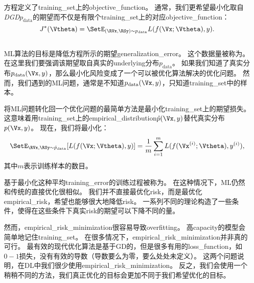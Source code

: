 方程定义了\gls{training_set}上的\gls{objective_function}。
通常，我们更希望最小化取自\emph{\gls{DGD}}$p_{\text{data}}$的期望而不仅是有限个\gls{training_set}上的对应\gls{objective_function}：
\begin{equation}
\label{eq:8.2}
    J^*(\Vtheta) = \SetE_{(\RVx, \RSy) \sim p_\text{data}} L(f(\Vx ;\Vtheta),y).
\end{equation}


\subsection{}
\label{sec:empirical_risk_minimization}
\gls{ML}算法的目标是降低方程所示的期望\gls{generalization_error}。
这个数据量被称为。
在这里我们要强调该期望取自真实的\gls{underlying}分布$p_{\text{data}}$。
如果我们知道了真实分布$p_{\text{data}}(\Vx, y)$，那么最小化风险变成了一个可以被优化算法解决的优化问题。
然而，我们遇到的\gls{ML}问题，通常是不知道$p_\text{data}(\Vx, y)$，只知道\gls{training_set}中的样本。


将\gls{ML}问题转化回一个优化问题的最简单方法是最小化\gls{training_set}上的期望损失。
这意味着用\gls{training_set}上的\gls{empirical_distribution}$\hat{p}(\Vx,y)$替代真实分布$p(\Vx,y)$。
现在，我们将最小化：
\begin{equation}
\label{eq:8.3}
    \SetE_{\RVx, \RSy \sim \hat{p}_\text{data}} [L(f(\Vx ; \Vtheta), y)]
    = \frac{1}{m} \sum_{i=1}^m L( f(\Vx^{(i)}; \Vtheta), y^{(i)}) ,
\end{equation}
其中$m$表示训练样本的数目。


基于最小化这种平均\gls{training_error}的训练过程被称为。
在这种情况下，\gls{ML}仍然和传统的直接优化很相似。
我们并不直接最优化\gls{risk}，而是最优化\gls{empirical_risk}，希望也能够很大地降低\gls{risk}。
一系列不同的理论构造了一些条件，使得在这些条件下真实\gls{risk}的期望可以下降不同的量。


然而，\gls{empirical_risk_minimization}很容易导致\gls{overfitting}。
高\gls{capacity}的模型会简单地记住\gls{training_set}。
在很多情况下，\gls{empirical_risk_minimization}并非真的可行。
最有效的现代优化算法是基于\gls{GD}的，但是很多有用的\gls{loss_function}，如$0-1$损失，没有有效的导数（导数要么为零，要么处处未定义）。
这两个问题说明，在\gls{DL}中我们很少使用\gls{empirical_risk_minimization}。
反之，我们会使用一个稍稍不同的方法，我们真正优化的目标会更加不同于我们希望优化的目标。


